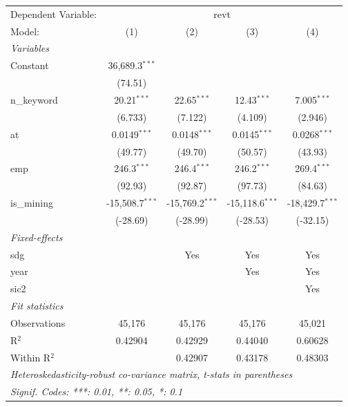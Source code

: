 
\begingroup
\centering
\begin{tabular}{lcccc}
   \tabularnewline \midrule \midrule
   Dependent Variable: & \multicolumn{4}{c}{revt}\\
   Model:       & (1)               & (2)               & (3)               & (4)\\  
   \midrule
   \emph{Variables}\\
   Constant     & 36,689.3$^{***}$  &                   &                   &   \\   
                & (74.51)           &                   &                   &   \\   
   n\_keyword   & 20.21$^{***}$     & 22.65$^{***}$     & 12.43$^{***}$     & 7.005$^{***}$\\   
                & (6.733)           & (7.122)           & (4.109)           & (2.946)\\   
   at           & 0.0149$^{***}$    & 0.0148$^{***}$    & 0.0145$^{***}$    & 0.0268$^{***}$\\   
                & (49.77)           & (49.70)           & (50.57)           & (43.93)\\   
   emp          & 246.3$^{***}$     & 246.4$^{***}$     & 246.2$^{***}$     & 269.4$^{***}$\\   
                & (92.93)           & (92.87)           & (97.73)           & (84.63)\\   
   is\_mining   & -15,508.7$^{***}$ & -15,769.2$^{***}$ & -15,118.6$^{***}$ & -18,429.7$^{***}$\\   
                & (-28.69)          & (-28.99)          & (-28.53)          & (-32.15)\\   
   \midrule
   \emph{Fixed-effects}\\
   sdg          &                   & Yes               & Yes               & Yes\\  
   year         &                   &                   & Yes               & Yes\\  
   sic2         &                   &                   &                   & Yes\\  
   \midrule
   \emph{Fit statistics}\\
   Observations & 45,176            & 45,176            & 45,176            & 45,021\\  
   R$^2$        & 0.42904           & 0.42929           & 0.44040           & 0.60628\\  
   Within R$^2$ &                   & 0.42907           & 0.43178           & 0.48303\\  
   \midrule \midrule
   \multicolumn{5}{l}{\emph{Heteroskedasticity-robust co-variance matrix, t-stats in parentheses}}\\
   \multicolumn{5}{l}{\emph{Signif. Codes: ***: 0.01, **: 0.05, *: 0.1}}\\
\end{tabular}
\par\endgroup



